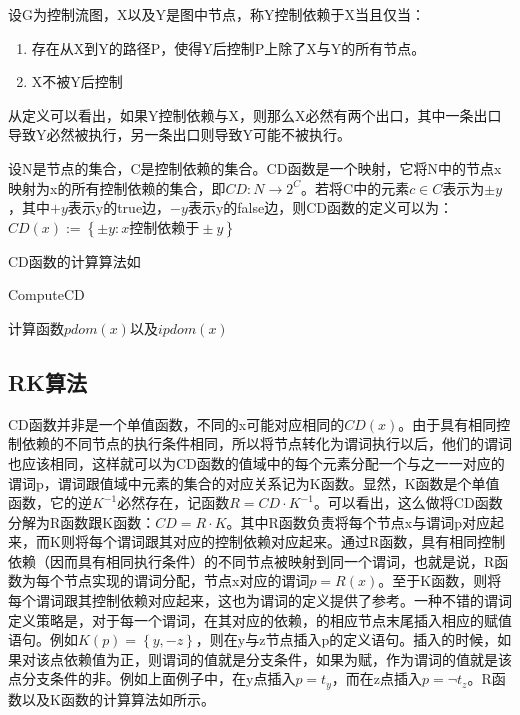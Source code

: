 \begin{definition}
设G为控制流图，X以及Y是图中节点，称Y控制依赖于X当且仅当：
\begin{enumerate}
\item 存在从X到Y的路径P，使得Y后控制P上除了X与Y的所有节点。
\item X不被Y后控制
\end{enumerate}
\end{definition}
从定义可以看出，如果Y控制依赖与X，则那么X必然有两个出口，其中一条出口导致Y必然被执行，另一条出口则导致Y可能不被执行。

\begin{definition}[CD函数]
设N是节点的集合，C是控制依赖的集合。CD函数是一个映射，它将N中的节点x映射为x的所有控制依赖的集合，即$CD:N\to 2^C$。若将C中的元素$c\in C$表示为$\pm y$，其中$+y$表示y的true边，$-y$表示y的false边，则CD函数的定义可以为：$CD\left(x\right):=\left\{\pm y:x\text{控制依赖于}\pm y\right\}$
\end{definition}
CD函数的计算算法如

\begin{algorithm}[H]
	\label{alg:ComputeCD}
	\caption{ComputeCD}
	计算函数$pdom\left(x\right)$以及$ipdom\left(x\right)$\;
\end{algorithm}

\subsection{RK算法}

CD函数并非是一个单值函数，不同的x可能对应相同的$CD\left(x\right)$。由于具有相同控制依赖的不同节点的执行条件相同，所以将节点转化为谓词执行以后，他们的谓词也应该相同，这样就可以为CD函数的值域中的每个元素分配一个与之一一对应的谓词p，谓词跟值域中元素的集合的对应关系记为K函数。显然，K函数是个单值函数，它的逆$K^{-1}$必然存在，记函数$R=CD\cdot K^{-1}$。可以看出，这么做将CD函数分解为R函数跟K函数：$CD=R\cdot K$。其中R函数负责将每个节点x与谓词p对应起来，而K则将每个谓词跟其对应的控制依赖对应起来。通过R函数，具有相同控制依赖（因而具有相同执行条件）的不同节点被映射到同一个谓词，也就是说，R函数为每个节点实现的谓词分配，节点x对应的谓词$p=R\left(x\right)$。至于K函数，则将每个谓词跟其控制依赖对应起来，这也为谓词的定义提供了参考。一种不错的谓词定义策略是，对于每一个谓词，在其对应的依赖，的相应节点末尾插入相应的赋值语句。例如$K\left(p\right)=\left\{y,-z\right\}$，则在y与z节点插入p的定义语句。插入的时候，如果对该点依赖值为正，则谓词的值就是分支条件，如果为赋，作为谓词的值就是该点分支条件的非。例如上面例子中，在y点插入$p=t_y$，而在z点插入$p=\neg t_z$。R函数以及K函数的计算算法如所示。

